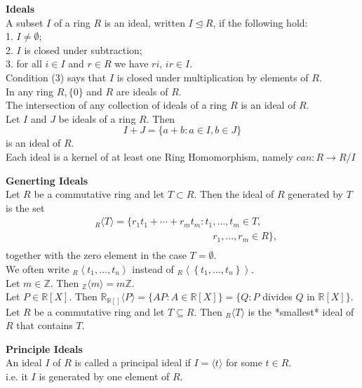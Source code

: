 \documentclass[a4paper, 10pt]{article}
\begin{document}
\begin{multicols*}{3}
\textbf{Ideals}\\
A subset $I$ of a ring $R$ is an ideal, written $I \unlhd R$, if the following hold:\\
1. $I \neq \emptyset$;\\
2. $I$ is closed under subtraction;\\
3. for all $i \in I$ and $r \in R$ we have $r i$, $ir \in I$.\\
Condition (3) says that $I$ is closed under multiplication by elements of $R$.\\
In any ring $R,\{0\}$ and $R$ are ideals of $R$. \\
The intersection of any collection of ideals of a ring $R$ is an ideal of $R$.\\
Let $I$ and $J$ be ideals of a ring $R$. Then
$$
I+J=\{a+b: a \in I, b \in J\}
$$
is an ideal of $R$.\\
Each ideal is a kernel of at least one Ring Homomorphism, namely $can : R \rightarrow R/I$

\textbf{Generting Ideals}\\
Let $R$ be a commutative ring and let $T \subset R$. 
Then the ideal of $R$ generated by $T$ is the set
\begin{align*}
&{ }_R\langle T\rangle=\{r_1 t_1+\cdots+r_m t_m: t_1, \ldots, t_m \in T, \\
&\qquad\qquad\qquad\qquad\qquad\qquad r_1, \ldots, r_m \in R\},\\
\end{align*}
together with the zero element in the case $T=\emptyset$. \\
We often write ${ }_R\left\langle t_1, \ldots, t_n\right\rangle$ instead of ${ }_R\left\langle\left\{t_1, \ldots, t_n\right\}\right\rangle$.\\
Let $m \in \mathbb{Z}$. Then ${ }_{\mathbb{Z}}\langle m\rangle=m \mathbb{Z}$.\\
Let $P \in \mathbb{R}[X]$. Then $\mathbb{R}_{\mathbb{R}[]}\langle P\rangle=\{A P: A \in \mathbb{R}[X]\}=\{Q: P$ divides $Q$ in $\mathbb{R}[X]\}$.\\
Let $R$ be a commutative ring and let $T \subseteq R$. Then ${ }_R\langle T\rangle$ is the *smallest* ideal of $R$ that contains $T$.

\textbf{Principle Ideals}\\
An ideal $I$ of $R$ is called a principal ideal if $I=\langle t\rangle$ for some $t \in R$.\\
i.e. it $I$ is generated by one element of $R$.


\end{multicols*}
\end{document}
